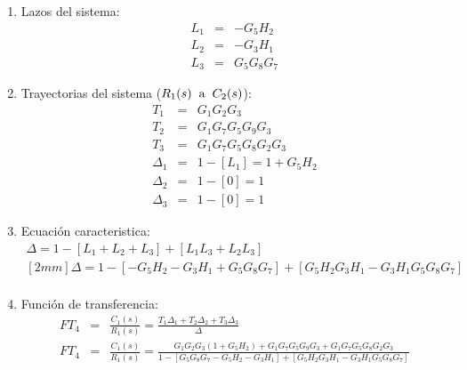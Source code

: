 \documentclass[12pt]{article}
\begin{document}
\begin{enumerate}
  \item Lazos del sistema:
    \begin{eqnarray*}
      L_{1} &=& - G_{5}H_{2} \\
      L_{2} &=& - G_{3}H_{1} \\
      L_{3} &=& G_{5}G_{8}G_{7}
    \end{eqnarray*}
  \item Trayectorias del sistema ($R_{1}(s) \hspace{2mm} \text{a} \hspace{2mm} C_{2}(s)$):
    \begin{eqnarray*}
      T_{1} &=& G_{1}G_{2}G_{3} \\
      T_{2} &=& G_{1}G_{7}G_{5}G_{9}G_{3} \\
      T_{3} &=& G_{1}G_{7}G_{5}G_{8}G_{2}G_{3} \\
      \Delta_{1} &=& 1-[L_{1}]=1+G_{5}H_{2} \\
      \Delta_{2} &=& 1-[0]=1 \\
      \Delta_{3} &=& 1-[0]=1
    \end{eqnarray*}
  \item Ecuaci\'on caracteristica:
    \begin{eqnarray*}
      \Delta = 1-[L_{1}+L_{2}+L_{3}]+[L_{1}L_{3}+L_{2}L_{3}] \\ [2mm]
      \Delta = 1-[-G_{5}H_{2}-G_{3}H_{1}+G_{5}G_{8}G_{7}]+[G_{5}H_{2}G_{3}H_{1}-G_{3}H_{1}G_{5}G_{8}G_{7}]\\
    \end{eqnarray*}
  \item Funci\'on de transferencia:
    \begin{eqnarray*}
      FT_{4} &=& \frac{C_{1}(s)}{R_{1}(s)}=\frac{T_{1}\Delta_{1}+T_{2}\Delta_{2}+T_{3}\Delta_{3}}{\Delta} \\[5mm]
      FT_{4} &=& \frac{C_{1}(s)}{R_{1}(s)} = \frac{G_{1}G_{2}G_{3}(1+G_{5}H_{2})+G_{1}G_{7}G_{5}G_{9}G_{3}+G_{1}G_{7}G_{5}G_{8}G_{2}G_{3}}{1-[G_{5}G_{8}G_{7}-G_{5}H_{2}-G_{3}H_{1}]+[G_{5}H_{2}G_{3}H_{1}-G_{3}H_{1}G_{5}G_{8}G_{7}]} \\
    \end{eqnarray*}
\end{enumerate}

\newpage
\end{document}
